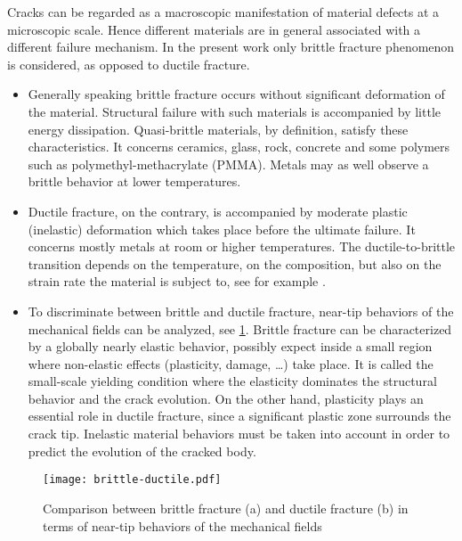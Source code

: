 Cracks can be regarded as a macroscopic manifestation of material defects at a microscopic scale. Hence different materials are in general associated with a different failure mechanism. In the present work only brittle fracture phenomenon is considered, as opposed to ductile fracture.
\begin{itemize}
\item Generally speaking brittle fracture occurs without significant deformation of the material. Structural failure with such materials is accompanied by little energy dissipation. Quasi-brittle materials, by definition, satisfy these characteristics. It concerns ceramics, glass, rock, concrete and some polymers such as polymethyl-methacrylate (PMMA). Metals may as well observe a brittle behavior at lower temperatures.

\item Ductile fracture, on the contrary, is accompanied by moderate plastic (inelastic) deformation which takes place before the ultimate failure. It concerns mostly metals at room or higher temperatures. The ductile-to-brittle transition depends on the temperature, on the composition, but also on the strain rate the material is subject to, see for example \cite{Kalthoff:2000}.

\item To discriminate between brittle and ductile fracture, near-tip behaviors of the mechanical fields can be analyzed, see \cref{fig:brittleductile}. Brittle fracture can be characterized by a globally nearly elastic behavior, possibly expect inside a small region where non-elastic effects (plasticity, damage, \ldots) take place. It is called the small-scale yielding condition where the elasticity dominates the structural behavior and the crack evolution. On the other hand, plasticity plays an essential role in ductile fracture, since a significant plastic zone surrounds the crack tip. Inelastic material behaviors must be taken into account in order to predict the evolution of the cracked body.
\end{itemize} 
\begin{figure}[htbp]
\centering
\texttt{[image: brittle-ductile.pdf]}
\caption{Comparison between brittle fracture (a) and ductile fracture (b) in terms of near-tip behaviors of the mechanical fields} \label{fig:brittleductile}
\end{figure}

